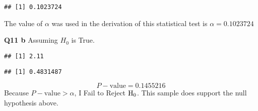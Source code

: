 \documentclass[
]{article}
\newenvironment{Shaded}{\begin{snugshade}}{\end{snugshade}}
\newcommand{\AttributeTok}[1]{\textcolor[rgb]{0.77,0.63,0.00}{#1}}
\newcommand{\CommentTok}[1]{\textcolor[rgb]{0.56,0.35,0.01}{\textit{#1}}}
\newcommand{\ControlFlowTok}[1]{\textcolor[rgb]{0.13,0.29,0.53}{\textbf{#1}}}
\newcommand{\DecValTok}[1]{\textcolor[rgb]{0.00,0.00,0.81}{#1}}
\newcommand{\FloatTok}[1]{\textcolor[rgb]{0.00,0.00,0.81}{#1}}
\newcommand{\FunctionTok}[1]{\textcolor[rgb]{0.00,0.00,0.00}{#1}}
\newcommand{\NormalTok}[1]{#1}
\newcommand{\OtherTok}[1]{\textcolor[rgb]{0.56,0.35,0.01}{#1}}
\newcommand{\SpecialCharTok}[1]{\textcolor[rgb]{0.00,0.00,0.00}{#1}}
\begin{document}
\begin{Shaded}
\end{Shaded}

\begin{verbatim}
## [1] 0.1023724
\end{verbatim}

The value of \(\alpha\) was used in the derivation of this statistical
test is \(\alpha = 0.1023724\)

\textbf{Q11 b} Assuming \(H_{0}\) is True.

\begin{Shaded}
\end{Shaded}

\begin{verbatim}
## [1] 2.11
\end{verbatim}

\begin{Shaded}
\end{Shaded}

\begin{verbatim}
## [1] 0.4831487
\end{verbatim}

\[
P-\text{value} = 0.1455216 
\] Because \(P-\text{value} > \alpha\), I Fail to Reject
\({\rm H}_{0}\). This sample does support the null hypothesis above.
\end{document}
